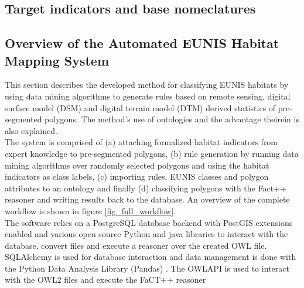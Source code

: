 \documentclass[authoryear, review,12pt,number]{elsarticle}
\begin{document}
\subsection{Target indicators and base nomeclatures}
\label{subsec_indicators_and_nomenclatures}%
\subsection{Overview of the Automated EUNIS Habitat Mapping System}
This section describes the developed method for classifying
EUNIS habitats by using data mining algorithms to generate rules based on
remote sensing, digital surface model (DSM) and digital terrain model
(DTM) derived statistics of pre-segmented polygons. The method's use of
ontologies and the advantage theirein is also explained.\\
The system is comprised of (a) attaching formalized habitat indicators from
expert knowledge to pre-segmented polygons, (b) rule generation by running data
mining algorithms over randomly selected polygons and using the habitat
indicators as class labels, (c) importing rules, EUNIS classes and polygon
attributes to an ontology and finally (d) classifying polygons with the Fact++
reasoner \citep{Tsarkov2006} and writing results back to the database. An
overview of the complete workflow is shown in figure \ref{fig_full_workflow}.\\
The software relies on a PostgreSQL database backend with PostGIS extensions
enabled and various open source Python and java libraries to interact with the
database, convert files and execute a reasoner over the created OWL file. 
SQLAlchemy is used for database interaction and data management is done with
the Python Data Analysis Library (Pandas) \citep{McKinney2010}. The OWLAPI is
used to interact with the OWL2 files and execute the FaCT++ reasoner
\end{document}
